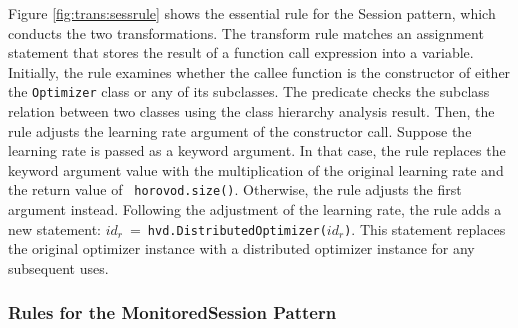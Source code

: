Figure \ref{fig:trans:sessrule} shows the essential rule for the Session pattern,
which conducts the two transformations.
The transform rule matches an assignment statement that stores the result of a
function call expression into a variable.
Initially, the rule examines whether the callee function is the constructor of
either the {\tt Optimizer} class or any of its subclasses.
The predicate \ktsubtysubs{\smodenv} checks the subclass relation between two
classes using the class hierarchy analysis result.
Then, the rule adjusts the learning rate argument of the constructor call. 
Suppose the learning rate is passed as a keyword argument. 
In that case, the rule replaces the keyword argument value with the
multiplication of the original learning rate and the return value of {\tt
horovod.size()}.
Otherwise, the rule adjusts the first argument instead.
Following the adjustment of the learning rate, the rule adds a new statement:
$id_r\ =\ ${\tt hvd.DistributedOptimizer($id_r$)}. 
This statement replaces the original optimizer instance with a distributed
optimizer instance for any subsequent uses.



\subsubsection{Rules for the MonitoredSession Pattern}



